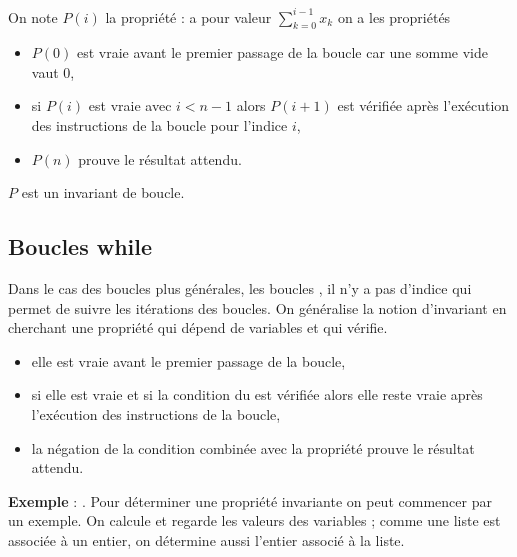 On note $P(i)$ la propriété :  a pour valeur $\displaystyle \sum_{k=0}^{i-1} x_k$ on a les propriétés
\begin{itemize}
\item $P(0)$ est vraie avant le premier passage de la boucle car une somme vide vaut 0,
\item si  $P(i)$ est vraie avec $i < n-1$ alors $P(i+1)$ est vérifiée après l'exécution des instructions de la boucle pour l'indice $i$,
\item $P(n)$ prouve le résultat attendu.
\end{itemize}
$P$ est un invariant de boucle.
\newpage
\subsection{Boucles while}
Dans le cas des boucles plus générales, les boucles , il n'y a pas d'indice qui permet de suivre les itérations des boucles. On généralise la notion d'invariant en cherchant une propriété qui dépend de variables et qui vérifie.
\begin{itemize}
\item elle est vraie avant le premier passage de la boucle,
\item si  elle est vraie et si la condition du  est vérifiée alors elle reste vraie après l'exécution des instructions de la boucle,
\item la négation de la condition combinée avec la propriété prouve le résultat attendu.
\end{itemize}

\medskip

{\bf Exemple}  : .
Pour déterminer une propriété invariante on peut commencer par un exemple. On calcule  et regarde les valeurs des variables ; comme une liste est associée à un entier, on détermine aussi l'entier associé à la liste.

